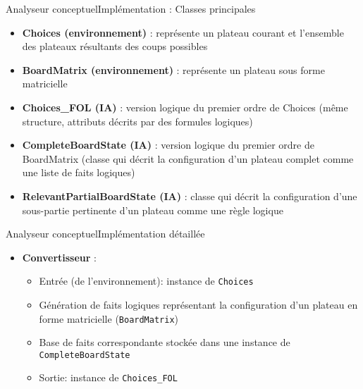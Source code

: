 \begin{frame}{Analyseur conceptuel}{Implémentation : Classes principales}
\begin{itemize}
  \item \textbf {Choices (environnement)} : représente un plateau
  courant et l'ensemble des plateaux résultants des coups possibles
  \pause
  \item \textbf {BoardMatrix (environnement)} : représente un plateau sous forme
  matricielle
  \pause
  \item \textbf {Choices\_FOL (IA)} : version logique du premier ordre de
  Choices (même structure, attributs décrits par des formules logiques)
  \pause
  \item \textbf {CompleteBoardState (IA)} : version logique du premier ordre de
  BoardMatrix (classe qui décrit la configuration
  d'un plateau complet comme une liste de faits logiques)
  \pause
  \item \textbf {RelevantPartialBoardState (IA)} : classe qui décrit la
  configuration d'une sous-partie pertinente d'un plateau comme une règle
  logique 
\end{itemize}
\end{frame}


\begin{frame}{Analyseur conceptuel}{Implémentation détaillée}
\begin{itemize}
  \item \textbf {Convertisseur} :
  \begin{itemize}
    \item Entrée (de l'environnement): instance de \texttt{Choices}
    \pause
    \item Génération de faits logiques représentant la configuration d'un
    plateau en forme matricielle (\texttt{BoardMatrix})
    \pause
    \item Base de faits correspondante stockée dans une instance de
    \texttt{CompleteBoardState}
    \pause
    \item Sortie: instance de
    \texttt{Choices\_FOL}
  \end{itemize}
\end{itemize}
\end{frame}

